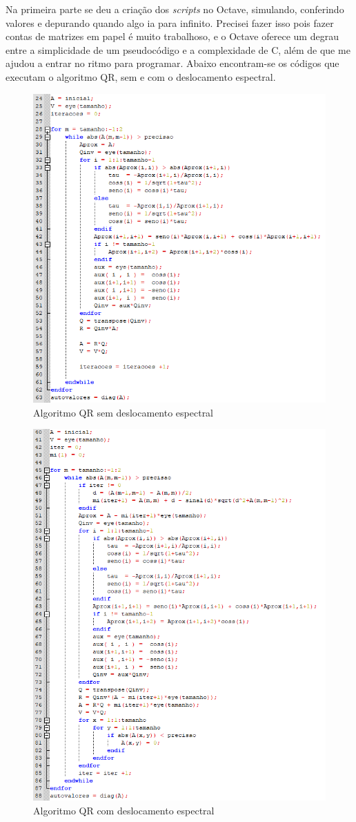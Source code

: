 \documentclass[12pt]{article} %
\begin{document}
    Na primeira parte se deu a criação dos \textit{scripts} no Octave, simulando, conferindo valores e depurando quando algo ia para infinito. Precisei fazer isso pois fazer contas de matrizes em papel é muito trabalhoso, e o Octave oferece um degrau entre a simplicidade de um pseudocódigo e a complexidade de C, além de que me ajudou a entrar no ritmo para programar. Abaixo encontram-se os códigos que executam o algoritmo QR, sem e com o deslocamento espectral.
    
    \begin{figure}[H]
        \centering
        \includegraphics[width=0.75\linewidth]{QRsem.png}
        \caption{Algoritmo QR sem deslocamento espectral}
        \label{fig:QRsem}
    \end{figure}
    
    \begin{figure}[h]
        \centering
        \includegraphics[width=0.75\linewidth]{QRcom.png}
        \caption{Algoritmo QR com deslocamento espectral}
        \label{fig:QRcom}
    \end{figure}
    
\end{document}
